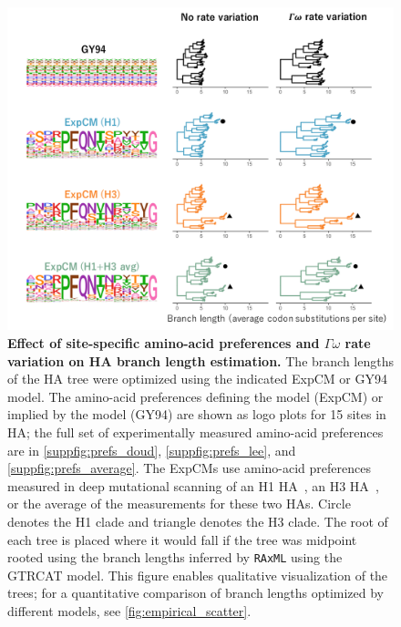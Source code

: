 \documentclass[11pt]{article}
\begin{document}
\begin{figure}
\centerline{\includegraphics[width=\textwidth]{figures/empirical_trees.pdf}}
\caption{\label{fig:empirical_trees}
\textbf{Effect of site-specific amino-acid preferences and $\Gamma\omega$ rate variation on HA branch length estimation.} 
The branch lengths of the HA tree were optimized using the indicated ExpCM or GY94 model. 
The amino-acid preferences defining the model (ExpCM) or implied by the model (GY94) are shown as logo plots for 15 sites in HA; the full set of experimentally measured amino-acid preferences are in \ref{suppfig:prefs_doud}, \ref{suppfig:prefs_lee}, and \ref{suppfig:prefs_average}. 
The ExpCMs use amino-acid preferences measured in deep mutational scanning of an H1 HA~\citep{doud2016accurate}, an H3 HA~\citep{lee2018deep}, or the average of the measurements for these two HAs.
Circle denotes the H1 clade and triangle denotes the H3 clade.
The root of each tree is placed where it would fall if the tree was midpoint rooted using the branch lengths inferred by \texttt{RAxML} using the GTRCAT model. 
This figure enables qualitative visualization of the trees; for a quantitative comparison of branch lengths optimized by different models, see \ref{fig:empirical_scatter}. 
}
\end{figure}
 
\end{document}
